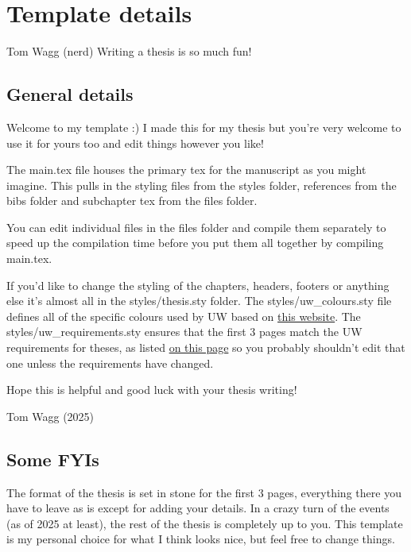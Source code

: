 \documentclass[../Main.tex]{subfiles}
\begin{document}
\chapter{Template details}

\begin{chapquote}{Tom Wagg (nerd)}
    \noindent Writing a thesis is so much fun!
\end{chapquote}
\chaptertoc{}

\section{General details}

Welcome to my template :) I made this for my thesis but you're very welcome to use it for yours too and edit things however you like!

The main.tex file houses the primary tex for the manuscript as you might imagine. This pulls in the styling files from the styles folder, references from the bibs folder and subchapter tex from the files folder.

You can edit individual files in the files folder and compile them separately to speed up the compilation time before you put them all together by compiling main.tex.

If you'd like to change the styling of the chapters, headers, footers or anything else it's almost all in the styles/thesis.sty folder. The styles/uw\_colours.sty file defines all of the specific colours used by UW based on \href{https://www.washington.edu/brand/brand-elements/colors/}{this website}. The styles/uw\_requirements.sty ensures that the first 3 pages match the UW requirements for theses, as listed \href{https://grad.uw.edu/current-students/enrollment-through-graduation/thesis-dissertation/}{on this page} so you probably shouldn't edit that one unless the requirements have changed.

Hope this is helpful and good luck with your thesis writing!

\begin{flushright}
    Tom Wagg (2025)
\end{flushright}

\section{Some FYIs}
The format of the thesis is set in stone for the first 3 pages, everything there you have to leave as is except for adding your details. In a crazy turn of the events (as of 2025 at least), the rest of the thesis is completely up to you. This template is my personal choice for what I think looks nice, but feel free to change things.
\end{document}
